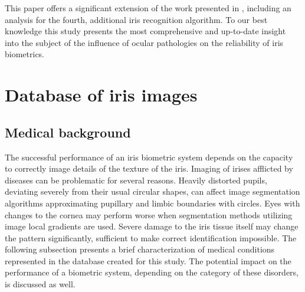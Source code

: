 \documentclass[article,12pt]{elsarticle}
\begin{document}
This paper offers a significant extension of the work presented in \cite{TrokielewiczBTAS2015}, including an analysis for the fourth, additional iris recognition algorithm. To our best knowledge this study presents the most comprehensive and up-to-date insight into the subject of the influence of ocular pathologies on the reliability of iris biometrics.


\section{Database of iris images}
\label{database}

\subsection{Medical background}

The successful performance of an iris biometric system depends on the capacity to correctly image details of the texture of the iris. Imaging of irises afflicted by diseases can be problematic for several reasons. Heavily distorted pupils, deviating severely from their usual circular shapes, can affect image segmentation algorithms approximating pupillary and limbic boundaries with circles. Eyes with changes to the cornea may perform worse when segmentation methods utilizing image local gradients are used. Severe damage to the iris tissue itself may change the pattern significantly, sufficient to make correct identification impossible. The following subsection presents a brief characterization of medical conditions represented in the database created for this study. The potential impact on the performance of a biometric system, depending on the category of these disorders, is discussed as well.
\end{document}
